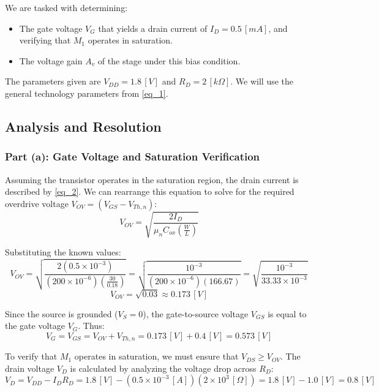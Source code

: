 \documentclass[12pt,a4paper]{article}
\begin{document}
We are tasked with determining:
\begin{itemize}
    \item[(a)] The gate voltage $V_{G}$ that yields a drain current of $I_{D} = 0.5 \, [mA]$, and verifying that $M_{1}$ operates in saturation.
    \item[(b)] The voltage gain $A_{v}$ of the stage under this bias condition.
\end{itemize}

The parameters given are $V_{DD} = 1.8 \, [V]$ and $R_{D} = 2 \, [k\Omega]$. We will use the general technology parameters from \autoref{eq_1}.


\subsection{Analysis and Resolution}                                \label{sec_5.2}
\subsubsection{Part (a): Gate Voltage and Saturation Verification}  \label{sec_5.2.1}
Assuming the transistor operates in the saturation region, the drain current is described by \autoref{eq_2}. We can rearrange this equation to solve for the required overdrive voltage $V_{OV} = (V_{GS} - V_{Th,n})$:
\begin{equation}
    V_{OV} = \sqrt{\frac{2 I_{D}}{\mu_{n} C_{ox} \left(\frac{W}{L}\right)}}
    \label{eq_31}
\end{equation}

Substituting the known values:
\begin{equation}
    V_{OV} = \sqrt{\frac{2 (0.5 \times 10^{-3})}{(200 \times 10^{-6}) \left(\frac{30}{0.18}\right)}} = \sqrt{\frac{10^{-3}}{(200 \times 10^{-6}) (166.67)}} = \sqrt{\frac{10^{-3}}{33.33 \times 10^{-3}}}
    \label{eq_32}
\end{equation}
\begin{equation}
    V_{OV} = \sqrt{0.03} \approx 0.173 \, [V]
    \label{eq_33}
\end{equation}

Since the source is grounded ($V_{S} = 0$), the gate-to-source voltage $V_{GS}$ is equal to the gate voltage $V_{G}$. Thus:
\begin{equation}
    V_{G} = V_{GS} = V_{OV} + V_{Th,n} = 0.173 \, [V] + 0.4 \, [V] = 0.573 \, [V]
    \label{eq_34}
\end{equation}

To verify that $M_{1}$ operates in saturation, we must ensure that $V_{DS} \ge V_{OV}$. The drain voltage $V_{D}$ is calculated by analyzing the voltage drop across $R_{D}$:
\begin{equation}
    V_{D} = V_{DD} - I_{D} R_{D} = 1.8 \, [V] - (0.5 \times 10^{-3} \, [A])(2 \times 10^{3} \, [\Omega]) = 1.8 \, [V] - 1.0 \, [V] = 0.8 \, [V]
    \label{eq_35}
\end{equation}
\end{document}
